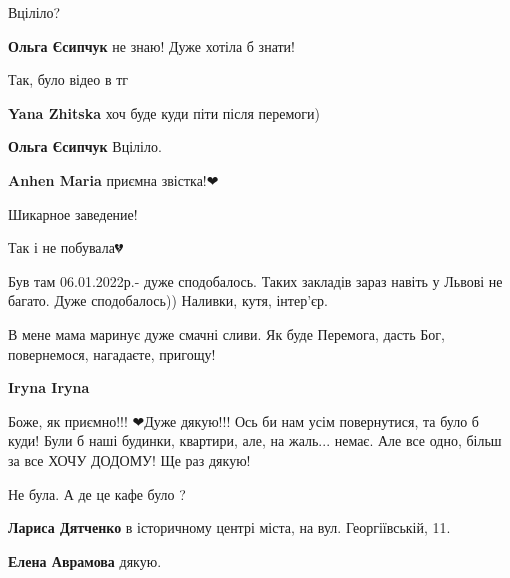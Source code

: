  
 
 
 
 

\qqSecCmt


Вціліло?

\begin{itemize} %
\textbf{Ольга Єсипчук} не знаю! Дуже хотіла б знати!

Так, було відео в тг

\textbf{Yana Zhitska} хоч буде куди піти після перемоги)

\textbf{Ольга Єсипчук} Вціліло.

\textbf{Anhen Maria} приємна звістка!❤
\end{itemize} %


Шикарное заведение!


Так і не побувала💔


Був там 06.01.2022р.- дуже сподобалось. Таких закладів зараз навіть у Львові не
багато. Дуже сподобалось)) Наливки, кутя, інтер'єр.


В мене мама маринує дуже смачні сливи. Як буде Перемога, дасть Бог,
повернемося, нагадаєте, пригощу!

\begin{itemize} %
\textbf{Iryna Iryna} 

Боже, як приємно!!! ❤Дуже дякую!!! Ось би нам усім повернутися, та було б куди!
Були б наші будинки, квартири, але, на жаль... немає. Але все одно, більш за
все ХОЧУ ДОДОМУ! Ще раз дякую!

\end{itemize} %


Не була. А де це кафе було ?

\begin{itemize} %
\textbf{Лариса Дятченко} в історичному центрі міста, на вул. Георгіївській, 11.

\textbf{Елена Аврамова} дякую.
\end{itemize} %

